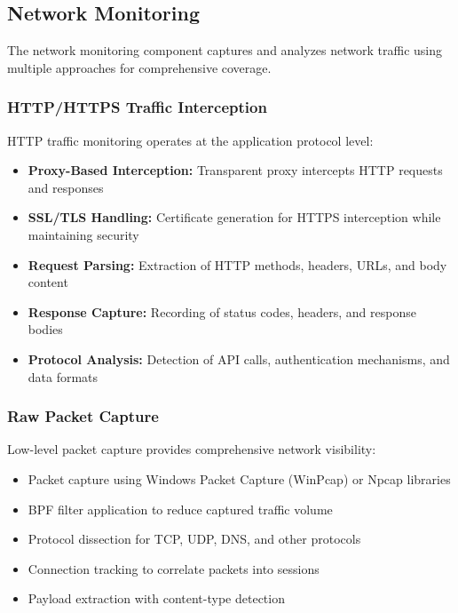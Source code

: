 \subsection{Network Monitoring}

The network monitoring component captures and analyzes network traffic using multiple approaches for comprehensive coverage.

\subsubsection{HTTP/HTTPS Traffic Interception}

HTTP traffic monitoring operates at the application protocol level:

\begin{itemize}
    \item \textbf{Proxy-Based Interception:} Transparent proxy intercepts HTTP requests and responses
    \item \textbf{SSL/TLS Handling:} Certificate generation for HTTPS interception while maintaining security
    \item \textbf{Request Parsing:} Extraction of HTTP methods, headers, URLs, and body content
    \item \textbf{Response Capture:} Recording of status codes, headers, and response bodies
    \item \textbf{Protocol Analysis:} Detection of API calls, authentication mechanisms, and data formats
\end{itemize}

\subsubsection{Raw Packet Capture}

Low-level packet capture provides comprehensive network visibility:

\begin{itemize}
    \item Packet capture using Windows Packet Capture (WinPcap) or Npcap libraries
    \item BPF filter application to reduce captured traffic volume
    \item Protocol dissection for TCP, UDP, DNS, and other protocols
    \item Connection tracking to correlate packets into sessions
    \item Payload extraction with content-type detection
\end{itemize}


